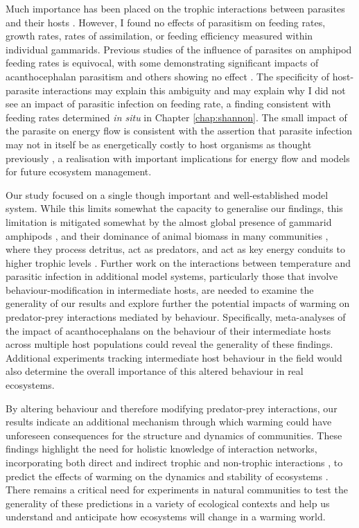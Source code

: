 Much importance has been placed on the trophic interactions between parasites and their hosts \citep{vanveen2008, chen2011, benesh2014}. However, I found no effects of parasitism on feeding rates, growth rates, rates of assimilation, or feeding efficiency measured within individual gammarids. Previous studies of the influence of parasites on amphipod feeding rates is equivocal, with some demonstrating significant impacts of acanthocephalan parasitism \citep{labaude2016, laverty2017} and others showing no effect \citep{fielding2003}. The specificity of host-parasite interactions may explain this ambiguity and may explain why I did not see an impact of parasitic infection on feeding rate, a finding consistent with feeding rates determined \emph{in situ} in Chapter \ref{chap:shannon}. The small impact of the parasite on energy flow is consistent with the assertion that parasite infection may not in itself be as energetically costly to host organisms as thought previously \citep{labaude2015influence}, a realisation with important implications for energy flow and models for future ecosystem management.

Our study focused on a single \textemdash though important and well-established \textemdash model system. While this limits somewhat the capacity to generalise our findings, this limitation is mitigated somewhat by the almost global presence of gammarid amphipods \citep{karaman1977, westram2011}, and their dominance of animal biomass in many communities \citep{mortensen1982}, where they process detritus, act as predators, and act as key energy conduits to higher trophic levels \citep{macneil1997, little2018}. Further work on the interactions between temperature and parasitic infection in additional model systems, particularly those that involve behaviour-modification in intermediate hosts, are needed to examine the generality of our results and explore further the potential impacts of warming on predator-prey interactions mediated by behaviour. Specifically, meta-analyses of the impact of acanthocephalans on the behaviour of their intermediate hosts across multiple host populations could reveal the generality of these findings. Additional experiments tracking intermediate host behaviour in the field would also determine the overall importance of this altered behaviour in real ecosystems.

By altering behaviour and therefore modifying predator-prey interactions, our results indicate an additional mechanism through which warming could have unforeseen consequences for the structure and dynamics of communities.  These findings highlight the need for holistic knowledge of interaction networks, incorporating both direct and indirect trophic and non-trophic interactions \citep{kefi2016}, to predict the effects of warming on the dynamics and stability of ecosystems \citep{kordas2017}. There remains a critical need for experiments in natural communities to test the generality of these predictions in a variety of ecological contexts and help us understand and anticipate how ecosystems will change in a warming world.

